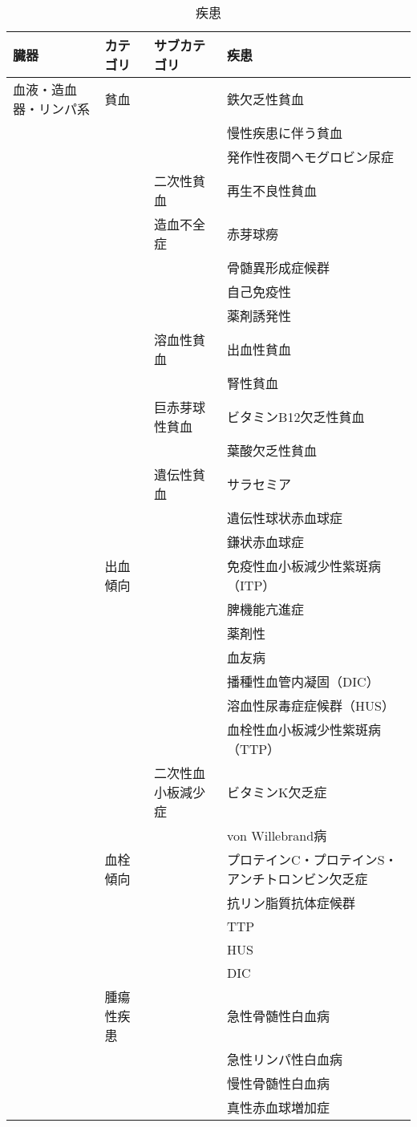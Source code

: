 \begin{xltabular}{\linewidth}{XXXX}
\caption{\label{tbl:疾患}疾患} \\
\toprule
臓器 & カテゴリ & サブカテゴリ & 疾患 \\
\midrule
\endhead
血液・造血器・リンパ系 & 貧血 &  & 鉄欠乏性貧血 \\
 &  &  & 慢性疾患に伴う貧血 \\
 &  &  & 発作性夜間ヘモグロビン尿症 \\
 &  & 二次性貧血 & 再生不良性貧血 \\
 &  & 造血不全症 & 赤芽球癆 \\
 &  &  & 骨髄異形成症候群 \\
 &  &  & 自己免疫性 \\
 &  &  & 薬剤誘発性 \\
 &  & 溶血性貧血 & 出血性貧血 \\
 &  &  & 腎性貧血 \\
 &  & 巨赤芽球性貧血 & ビタミンB12欠乏性貧血 \\
 &  &  & 葉酸欠乏性貧血 \\
 &  & 遺伝性貧血 & サラセミア \\
 &  &  & 遺伝性球状赤血球症 \\
 &  &  & 鎌状赤血球症 \\
 & 出血傾向 &  & 免疫性血小板減少性紫斑病（ITP） \\
 &  &  & 脾機能亢進症 \\
 &  &  & 薬剤性 \\
 &  &  & 血友病 \\
 &  &  & 播種性血管内凝固（DIC） \\
 &  &  & 溶血性尿毒症症候群（HUS） \\
 &  &  & 血栓性血小板減少性紫斑病（TTP） \\
 &  & 二次性血小板減少症 & ビタミンK欠乏症 \\
 &  &  & von Willebrand病 \\
 & 血栓傾向 &  & プロテインC・プロテインS・アンチトロンビン欠乏症 \\
 &  &  & 抗リン脂質抗体症候群 \\
 &  &  & TTP \\
 &  &  & HUS \\
 &  &  & DIC \\
 & 腫瘍性疾患 &  & 急性骨髄性白血病 \\
 &  &  & 急性リンパ性白血病 \\
 &  &  & 慢性骨髄性白血病 \\
 &  &  & 真性赤血球増加症 \\

\end{xltabular}
